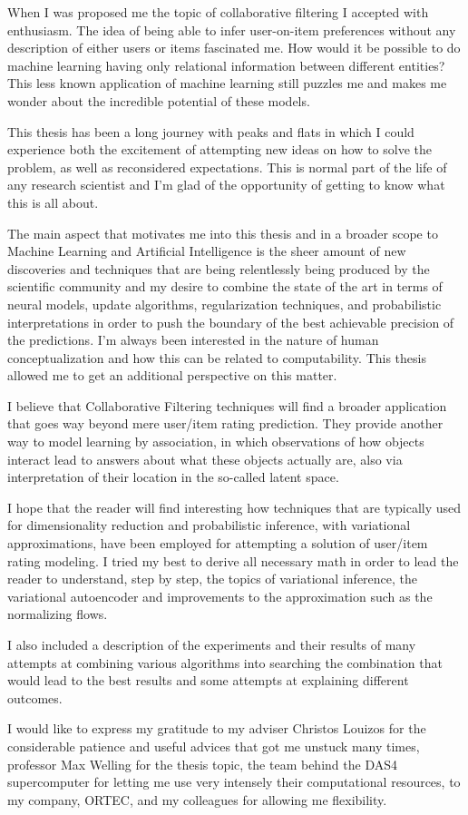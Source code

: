 
When I was proposed me the topic
of collaborative filtering
I accepted with enthusiasm.
The idea of being able to infer user-on-item preferences
without any description of either users
or items fascinated me. How would it be
possible to do machine learning
having only relational information between different
entities? This less known application of machine learning still puzzles me and makes me
wonder about the incredible potential of these models.

This thesis has been a long journey with peaks and flats in which I could
experience both the excitement of attempting new 
ideas on how to solve the problem, as well as reconsidered expectations.
This is normal part of the life of any research scientist
and I'm glad of the opportunity of getting to know what this is all about.

The main aspect that motivates me into this thesis and in a broader scope to
Machine Learning and Artificial Intelligence is the sheer amount of new discoveries and
techniques that are being relentlessly being produced by the scientific community
and my desire to combine the state of the art in terms of neural models, 
update algorithms,
regularization techniques,
and probabilistic interpretations in order to push the boundary
of the best achievable precision of the predictions.
I'm always been interested in the nature of human conceptualization
and how this can be related to computability. This thesis
allowed me to get an additional perspective on this matter.

I believe that Collaborative Filtering techniques will find a broader application
that goes way beyond mere user/item rating prediction. They provide another way
to model learning by association, in which observations of how objects interact
lead to answers about what these objects actually are, also via interpretation
of their location in the so-called latent space.

I hope that the reader will find interesting how techniques that are typically
used for dimensionality reduction and probabilistic inference, with variational
approximations, have been employed for attempting a solution of
user/item rating modeling. I tried my best to derive all necessary math
in order to lead the reader to understand, step by step, the topics of
variational inference, the variational autoencoder and improvements to
the approximation such as the normalizing flows.

I also included a description of the experiments and their results of
many attempts at combining various algorithms
into searching
the combination that would lead to the best results
and some attempts at explaining different outcomes.


I would like to express my gratitude to my adviser 
Christos Louizos for the considerable patience and
useful advices that got me unstuck many times, 
professor Max Welling for the thesis topic, the team behind the DAS4
supercomputer
\cite{das} for letting me use very intensely their computational resources,
to my company, ORTEC, and my colleagues for allowing me flexibility.


